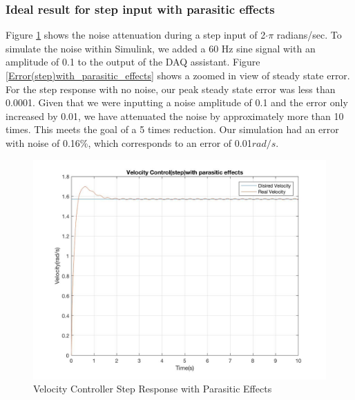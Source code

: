 \documentclass[letterpaper]{article}
\begin{document}
\subsubsection*{Ideal result for step input with parasitic effects}
Figure \ref{Velocity_control(step)with_parasitic_effects} shows the noise attenuation during a step input of 2$\cdot\pi$ radians/sec. To simulate the noise within Simulink, we added a 60 Hz sine signal with an amplitude of 0.1 to the output of the DAQ assistant. Figure \ref{Error(step)with_parasitic_effects} shows a zoomed in view of steady state error. For the step response with no noise, our peak steady state error was less than 0.0001. Given that we were inputting a noise amplitude of 0.1 and the error only increased by 0.01, we have attenuated the noise by approximately more than 10 times. This meets the goal of a 5 times reduction. Our simulation had an error with noise of 0.16\%, which corresponds to an error of 0.01$rad/s$.\\
\begin{figure}[H]
\begin{center}
\includegraphics[width = 12cm]{Velocity_control(step)with_parasitic_effects.jpg}
\caption{Velocity Controller Step Response with Parasitic Effects}
\label{Velocity_control(step)with_parasitic_effects}
\end{center}
\end{figure}
\end{document}
